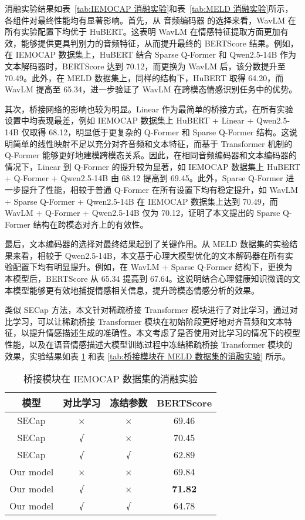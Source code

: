 消融实验结果如表~\ref{tab:IEMOCAP 消融实验}和表~\ref{tab:MELD 消融实验}所示，各组件对最终性能均有显著影响。首先，从 音频编码器 的选择来看，WavLM 在所有实验配置下均优于 HuBERT。这表明 WavLM 在情感特征提取方面更加有效，能够提供更具判别力的音频特征，从而提升最终的 BERTScore 结果。例如，在 IEMOCAP 数据集上，HuBERT 结合 Sparse Q-Former 和 Qwen2.5-14B 作为文本解码器时，BERTScore 达到 70.12，而更换为 WavLM 后，该分数提升至 70.49。此外，在 MELD 数据集上，同样的结构下，HuBERT 取得 64.20，而 WavLM 提高至 65.34，进一步验证了 WavLM 在跨模态情感识别任务中的优势。

其次，桥接网络的影响也较为明显。Linear 作为最简单的桥接方式，在所有实验设置中均表现最差，例如 IEMOCAP 数据集上 HuBERT + Linear + Qwen2.5-14B 仅取得 68.12，明显低于更复杂的 Q-Former 和 Sparse Q-Former 结构。这说明简单的线性映射不足以充分对齐音频和文本特征，而基于 Transformer 机制的 Q-Former 能够更好地建模跨模态关系。因此，在相同音频编码器和文本编码器的情况下，Linear 到 Q-Former 的提升较为显著，如 IEMOCAP 数据集上 HuBERT + Q-Former + Qwen2.5-14B 由 68.12 提高到 69.45。此外，Sparse Q-Former 进一步提升了性能，相较于普通 Q-Former 在所有设置下均有稳定提升，如 WavLM + Sparse Q-Former + Qwen2.5-14B 在 IEMOCAP 数据集上达到 70.49，而 WavLM + Q-Former + Qwen2.5-14B 仅为 70.12，证明了本文提出的 Sparse Q-Former 结构在跨模态对齐上的有效性。

最后，文本编码器的选择对最终结果起到了关键作用。从 MELD 数据集的实验结果来看，相较于 Qwen2.5-14B，本文基于心理大模型优化的文本解码器在所有实验配置下均有明显提升。例如，在 WavLM + Sparse Q-Former 结构下，更换为本模型后，BERTScore 从 65.34 提高到 67.64。这说明结合心理健康知识微调的文本模型能够更有效地捕捉情感相关信息，提升跨模态情感分析的效果。

类似 SECap 方法，本文针对稀疏桥接 Transformer 模块进行了对比学习，通过对比学习，可以让稀疏桥接 Transformer 模块在初始阶段更好地对齐音频和文本特征，以提升情感描述生成的准确性。本文考虑了是否使用对比学习的情况下的模型性能，以及在语音情感描述大模型训练过程中冻结稀疏桥接 Transformer 模块的效果，实验结果如表 \ref{tab:桥接模块在 IEMOCAP 数据集的消融实验} 和表 \ref{tab:桥接模块在 MELD 数据集的消融实验} 所示。

\begin{table}
  \centering
  \caption{桥接模块在 IEMOCAP 数据集的消融实验}
  \label{tab:桥接模块在 IEMOCAP 数据集的消融实验}
  \begin{tabular}{cccc}
      \toprule
      模型 & 对比学习 & 冻结参数 & BERTScore \\
      \midrule
      SECap & × & × & 69.46 \\
      SECap & √ & × & 70.45 \\
      SECap & √ & √ & 62.89 \\
      Our model & × & × & 69.84 \\
      Our model & √ & × & \textbf{71.82} \\
      Our model & √ & √ & 64.78 \\
      \bottomrule
  \end{tabular}
\end{table}


